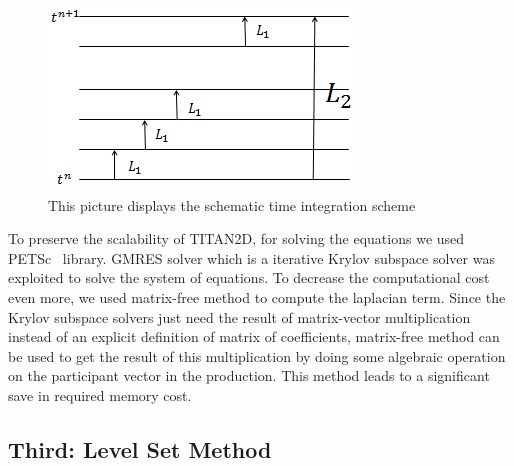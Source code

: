 \documentclass[letterpaper,10pt]{article}
\begin{document}
\begin{figure}[!h]
\label{figintegrator}
\begin{center} 
\includegraphics[width=2.5truein]{IMAGES/integrator.png}
\caption{This picture displays the schematic time integration scheme }
\end{center}
\end{figure}
To preserve the scalability of TITAN2D, for solving the equations we used PETSc~\cite{} library. GMRES solver which is a iterative Krylov subspace solver 
was exploited to solve the system of equations. To decrease the computational cost even more, we used matrix-free method 
to compute the laplacian term.
Since the Krylov subspace solvers just need the result of matrix-vector multiplication instead of an explicit definition of matrix 
of coefficients, matrix-free method can be used to get the result of this multiplication by doing some algebraic operation on 
the participant vector in the production. This method leads to a significant save in required memory cost.

\subsection{Third: Level Set Method} \label{level set}
\end{document}
